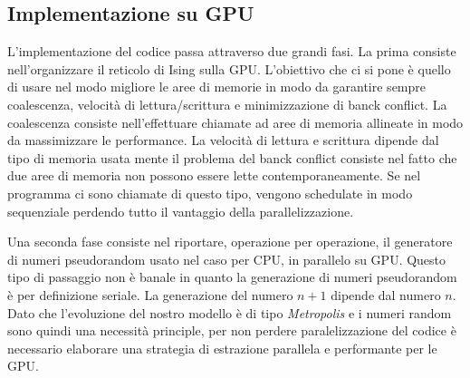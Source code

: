 \documentclass[a4paper,12pt]{article}
\begin{document}
\subsection{Implementazione su GPU}
L'implementazione del codice passa attraverso due grandi fasi. La prima consiste nell'organizzare il reticolo di Ising sulla GPU. L'obiettivo che ci si pone è quello di usare nel modo migliore le aree di memorie in modo da garantire sempre coalescenza, velocità di lettura/scrittura e minimizzazione di banck conflict. La coalescenza consiste nell'effettuare chiamate ad aree di memoria allineate in modo da massimizzare le performance. La velocità di lettura e scrittura dipende dal tipo di memoria usata mente il problema del banck conflict consiste nel fatto che due aree di memoria non possono essere lette contemporaneamente. Se nel programma ci sono chiamate di questo tipo,  vengono schedulate in modo sequenziale perdendo tutto il vantaggio della parallelizzazione.

Una seconda fase consiste nel riportare, operazione per operazione, il generatore di numeri pseudorandom usato nel caso per CPU, in parallelo su GPU. Questo tipo di passaggio non è banale in quanto la generazione di numeri pseudorandom è per definizione seriale. La generazione del numero $n+1$ dipende dal numero $n$. Dato che l'evoluzione del nostro modello è di tipo \emph{Metropolis} e i numeri random sono quindi una necessit\`a principle, per non perdere paralelizzazione del codice è necessario elaborare una strategia di estrazione parallela e performante per le GPU.
\end{document}
